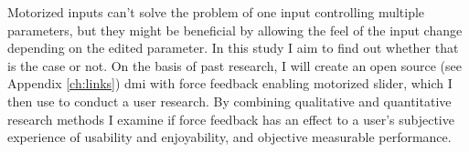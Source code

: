 Motorized inputs can't solve the problem of one input controlling multiple parameters, but they might be beneficial by allowing the feel of the input change depending on the edited parameter. In this study I aim to find out whether that is the case or not. On the basis of past research, I will create an open source (see Appendix \ref{ch:links}) \gls{dmi} with force feedback enabling motorized slider, which I then use to conduct a user research. By combining qualitative and quantitative research methods I examine if force feedback has an effect to a user's subjective experience of usability and enjoyability, and objective measurable performance.
